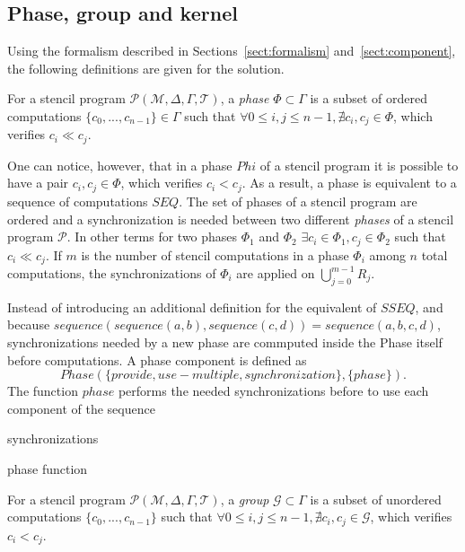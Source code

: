 \subsection{Phase, group and kernel}
Using the formalism described in Sections~\ref{sect:formalism} and~\ref{sect:component}, the following definitions are given for the solution.

\medskip
\begin{mydef}
For a stencil program $\mathcal{P}(\mathcal{M},\Delta,\Gamma,\mathcal{T})$, a \emph{phase} $\Phi \subset \Gamma$ is a subset of ordered computations $\{c_0,...,c_{n-1}\} \in \Gamma$ such that $\forall 0 \leq i,j \leq n-1, \nexists c_i,c_j \in \Phi$, which verifies $c_i \ll c_j$.
\end{mydef}

One can notice, however, that in a phase $Phi$ of a stencil program it is possible to have a pair $c_i,c_j \in \Phi$, which verifies $c_i<c_j$. As a result, a phase is equivalent to a sequence of computations $SEQ$. The set of phases of a stencil program are ordered and a synchronization is needed between two different \emph{phases} of a stencil program $\mathcal{P}$. In other terms for two phases $\Phi_1$ and $\Phi_2$ $\exists c_i \in \Phi_1, c_j \in \Phi_2$ such that $c_i \ll c_j$. If $m$ is the number of stencil computations in a phase $\Phi_i$ among $n$ total computations, the synchronizations of $\Phi_i$ are applied on $\bigcup_{j=0}^{m-1}R_j$. 

Instead of introducing an additional definition for the equivalent of $SSEQ$, and because $sequence(sequence(a,b),sequence(c,d))=sequence(a,b,c,d)$, synchronizations needed by a new phase are commputed inside the Phase itself before computations. A phase component is defined as
\begin{equation}
Phase(\{provide,use-multiple, synchronization\},\{phase\}).
\end{equation}
 The function $phase$ performs the needed synchronizations before to use each component of the sequence

\begin{algorithm}[H]
 synchronizations\\
 \caption{phase function}
 \end{algorithm}

\begin{mydef}
For a stencil program $\mathcal{P}(\mathcal{M},\Delta,\Gamma,\mathcal{T})$, a \emph{group} $\mathcal{G} \subset \Gamma$ is a subset of unordered computations $\{c_0,...,c_{n-1}\}$ such that $\forall 0 \leq i,j \leq n-1, \nexists c_i,c_j \in \mathcal{G}$, which verifies $c_i<c_j$.
\end{mydef}

